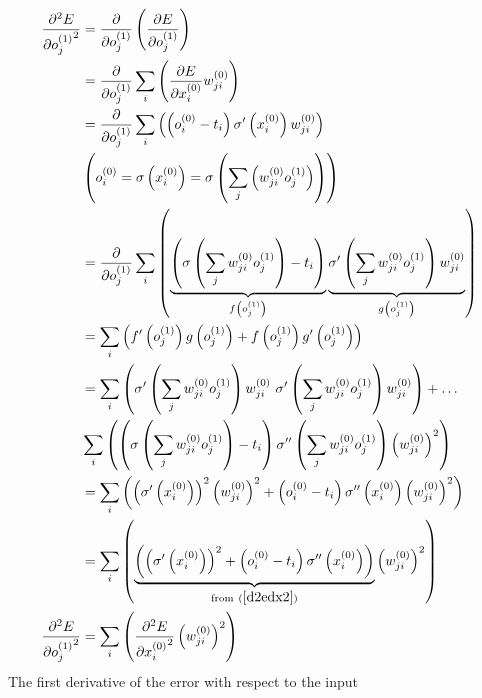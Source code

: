 \begin{align}
\pdv[2]{E}{{o_{j}^{(1)}}} &= 
\pdv{}{o_{j}^{(1)}}\left(
\pdv{E}{o_{j}^{(1)}}
\right)
\\
&= \pdv{}{o_{j}^{(1)}}
\sum_i\left(\pdv{E}{x_{i}^{(0)}}w_{ji}^{(0)}
\right)
\\
&= \pdv{}{o_{j}^{(1)}}
\sum_i\left(
\left(o_{i}^{(0)} - t_{i}\right)\sigma^{\prime}\left(x_{i}^{(0)}\right)w_{ji}^{(0)}
\right)
\\
&\left({o_{i}^{(0)}} = \sigma\left({x_{i}^{(0)}}\right) = \sigma\left(\sum_j\left({w_{ji}^{(0)}}{o_{j}^{(1)}}\right)\right)\right)
\\
&= \pdv{}{o_{j}^{(1)}}
\sum_i\left(
\underbrace{\left(\sigma\left(\sum_j{w_{ji}^{(0)}}{o_{j}^{(1)}}\right) - t_{i}\right)}
_{f\left(o_{j}^{(1)}\right)}
\underbrace{\sigma^{\prime}\left(\sum_j{w_{ji}^{(0)}}{o_{j}^{(1)}}\right)w_{ji}^{(0)}}
_{g\left(o_{j}^{(1)}\right)}
\right)
\\
&=\sum_i\left(f^{\prime}\left(o_{j}^{(1)}\right)g\left(o_{j}^{(1)}\right) + f\left(o_{j}^{(1)}\right)g^{\prime}\left(o_{j}^{(1)}\right)\right)
\\
&=\sum_i\left(
\sigma^{\prime}\left(\sum_j{w_{ji}^{(0)}}{o_{j}^{(1)}}\right)w_{ji}^{(0)} \
\sigma^{\prime}\left(\sum_j{w_{ji}^{(0)}}{o_{j}^{(1)}}\right)w_{ji}^{(0)}
\right)
+ \ldots \\
&\sum_i\left(
\left(\sigma\left(\sum_j{w_{ji}^{(0)}}{o_{j}^{(1)}}\right) - t_{i}\right)
\sigma^{\prime\prime}\left(\sum_j{w_{ji}^{(0)}}{o_{j}^{(1)}}\right)\left(w_{ji}^{(0)}\right)^2
\right)
\\
&=
\sum_i\left(
\left(\sigma^{\prime}\left(x_{i}^{(0)}\right)\right)^2\left({w_{ji}^{(0)}}\right)^2
+ 
\left(o_{i}^{(0)} - t_{i}\right)
\sigma^{\prime\prime}\left(x_{i}^{(0)}\right)\left({w_{ji}^{(0)}}\right)^2
\right)
\\
&=\sum_i
\left(
\underbrace{\left(\left(\sigma^{\prime}\left(x_{i}^{(0)}\right)\right)^2
+ 
\left(o_{i}^{(0)} - t_{i}\right)
\sigma^{\prime\prime}\left(x_{i}^{(0)}\right)\right)}
_{\text{from} \ (\ref{d2edx2})}
\left({w_{ji}^{(0)}}\right)^2\right)
\\
\pdv[2]{E}{{o_{j}^{(1)}}} &= \sum_i\left(
\pdv[2]{E}{{x_{i}^{(0)}}} \left({w_{ji}^{(0)}}\right)^2
\right)
\end{align}
The first derivative of the error with respect to the input
%
